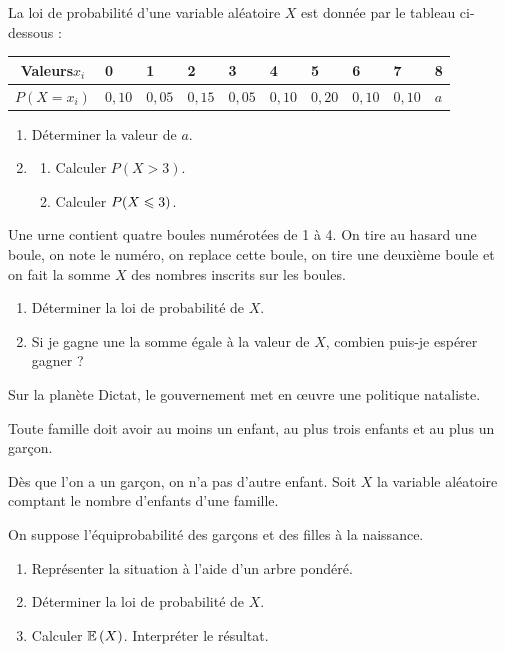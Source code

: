 \documentclass[a4paper,11pt]{article}
\begin{document}
\begin{cexercice}
La loi de probabilité d’une variable aléatoire $X$ est donnée par le tableau ci-dessous :

\begin{center}
	\begin{tabularx}{0.8\linewidth}{|c|Y|Y|Y|Y|Y|Y|Y|Y|Y|}
		\hline
		Valeurs$x_i$ & 0 & 1 & 2 & 3 & 4 & 5 & 6 & 7 & 8 \\ \hline
		$P(X=x_i)$ & $0,10$ & $0,05$ & $0,15$ & $0,05$ & $0,10$ & $0,20$ & $0,10$ & $0,10$ & $a$ \\ \hline
	\end{tabularx}
\end{center}

\begin{enumerate}
	\item Déterminer la valeur de $a$.
	\item 
	\begin{enumerate}
		\item Calculer $P(X > 3)$.
		\item Calculer $P(X \leqslant 3)$.
	\end{enumerate}
\end{enumerate}
\end{cexercice}

\begin{cexercice}
Une urne contient quatre boules numérotées de 1 à 4. On tire au hasard une boule, on note le numéro, on replace cette boule, on tire une deuxième boule et on fait la somme $X$ des nombres inscrits sur les boules.
%
\begin{enumerate}
	\item Déterminer la loi de probabilité de $X$.
	\item Si je gagne une la somme égale à la valeur de $X$, combien puis-je espérer gagner ?
\end{enumerate}
\end{cexercice}

\pagebreak

\begin{cexercice}
Sur la planète Dictat, le gouvernement met en œuvre une politique nataliste.

Toute famille doit avoir au moins un enfant, au plus trois enfants et au plus un garçon.

Dès que l’on a un garçon, on n’a pas d’autre enfant. Soit $X$ la variable aléatoire comptant le nombre d’enfants d’une famille.

On suppose l’équiprobabilité des garçons et des filles à la naissance.
%
\begin{enumerate}
	\item Représenter la situation à l'aide d'un arbre pondéré.
	\item Déterminer la loi de probabilité de $X$.
	\item Calculer $\mathbb{E}\left({X}\right)$. Interpréter le résultat.
\end{enumerate}
\end{cexercice}
\end{document}
